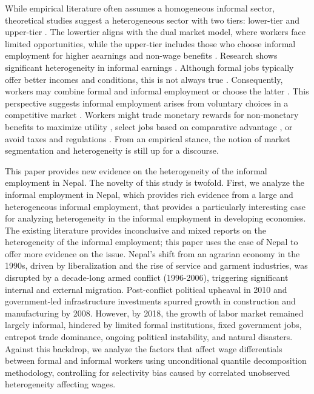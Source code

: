 While empirical literature often assumes a homogeneous informal sector, theoretical studies suggest a heterogeneous sector with two tiers: lower-tier and upper-tier \parencite{Fields1990}. The lower\-tier aligns with the dual market model, where workers face limited opportunities, while the upper-tier includes those who choose informal employment for higher aearnings and non-wage benefits \parencite{Cunningham2001, Henley2009}. Research shows significant heterogeneity in informal earnings \parencite{Radchenko2014, Ablaza2021, Garcia2017}. Although formal jobs typically offer better incomes and conditions, this is not always true \parencite{Tucker2020} . Consequently, workers may combine formal and informal employment or choose the latter \parencite{Hunt2009, Purser2009}. This perspective suggests informal employment arises from voluntary choices in a competitive market \parencite{Rosenzweig1988}. Workers might trade monetary rewards for non-monetary benefits to maximize utility \parencite{Maloney2004}, select jobs based on comparative advantage \parencite{Roy1951}, or avoid taxes and regulations \parencite{Fields2003} . From an empirical stance, the notion of market segmentation and heterogeneity is still up for a discourse.

This paper provides new evidence on the heterogeneity of the informal employment in Nepal. The novelty of this study is twofold. First, we analyze the informal employment in Nepal, which provides rich evidence from a large and heterogeneous informal employment, that provides a particularly interesting case for analyzing heterogeneity in the informal employment in developing economies.  The existing literature provides inconclusive and mixed reports on the heterogeneity of the informal
employment; this paper uses the case of Nepal to offer more evidence on the issue.  Nepal's shift from an agrarian economy in the 1990s, driven by liberalization and the rise of service and garment industries, was disrupted by a decade-long armed conflict (1996-2006), triggering significant internal and external migration. Post-conflict political upheaval in 2010 and government-led infrastructure investments spurred growth in construction and manufacturing by 2008. However, by 2018, the growth of labor market remained largely informal, hindered by limited formal institutions, fixed government jobs, entrepot trade dominance, ongoing political instability, and natural disasters. Against this backdrop, we analyze the factors that affect wage differentials between formal and informal workers using unconditional quantile decomposition  methodology, controlling for selectivity bias caused by correlated unobserved heterogeneity affecting wages.   

